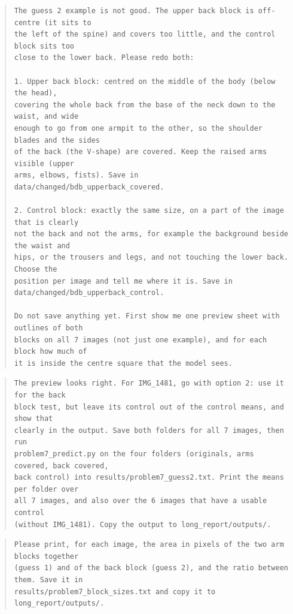 \documentclass[11pt]{article}
\begin{document}
\begin{quote}
\begin{Verbatim}[breaklines, fontsize=\small]
The guess 2 example is not good. The upper back block is off-centre (it sits to
the left of the spine) and covers too little, and the control block sits too
close to the lower back. Please redo both:

1. Upper back block: centred on the middle of the body (below the head),
covering the whole back from the base of the neck down to the waist, and wide
enough to go from one armpit to the other, so the shoulder blades and the sides
of the back (the V-shape) are covered. Keep the raised arms visible (upper
arms, elbows, fists). Save in data/changed/bdb_upperback_covered.

2. Control block: exactly the same size, on a part of the image that is clearly
not the back and not the arms, for example the background beside the waist and
hips, or the trousers and legs, and not touching the lower back. Choose the
position per image and tell me where it is. Save in
data/changed/bdb_upperback_control.

Do not save anything yet. First show me one preview sheet with outlines of both
blocks on all 7 images (not just one example), and for each block how much of
it is inside the centre square that the model sees.
\end{Verbatim}
\end{quote}
\begin{quote}
\begin{Verbatim}[breaklines, fontsize=\small]
The preview looks right. For IMG_1481, go with option 2: use it for the back
block test, but leave its control out of the control means, and show that
clearly in the output. Save both folders for all 7 images, then run
problem7_predict.py on the four folders (originals, arms covered, back covered,
back control) into results/problem7_guess2.txt. Print the means per folder over
all 7 images, and also over the 6 images that have a usable control
(without IMG_1481). Copy the output to long_report/outputs/.
\end{Verbatim}
\end{quote}
\begin{quote}
\begin{Verbatim}[breaklines, fontsize=\small]
Please print, for each image, the area in pixels of the two arm blocks together
(guess 1) and of the back block (guess 2), and the ratio between them. Save it in
results/problem7_block_sizes.txt and copy it to long_report/outputs/.
\end{Verbatim}
\end{quote}
\end{document}
